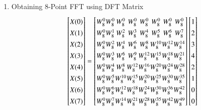 \documentclass[journal,12pt,twocolumn]{IEEEtran}
\renewcommand\thesection{\arabic{section}}
\begin{document}
\begin{enumerate}[label=\thesection.\arabic*.,ref=\thesection.\theenumi]
\item Obtaining 8-Point FFT using DFT Matrix
\begin{equation}
\renewcommand{\arraystretch}{1.35}
\setlength\arraycolsep{0.05pt}
\begin{bmatrix}
X(0) \\
X(1) \\
X(2) \\
X(3) \\
X(4) \\
X(5) \\
X(6) \\
X(7)
\end{bmatrix}
=
\begin{bmatrix}
W^{0}_{8} & W^{0}_{8} & W^{0}_{8} & W^{0}_{8} & W^{0}_{8} & W^{0}_{8} & W^{0}_{8} & W^{0}_{8}\\
W^{0}_{8} & W^{1}_{8} & W^{2}_{8} & W^{3}_{8} & W^{4}_{8} & W^{5}_{8} & W^{6}_{8} & W^{7}_{8}\\
W^{0}_{8} & W^{2}_{8} & W^{4}_{8} & W^{6}_{8} & W^{8}_{8} & W^{10}_{8} & W^{12}_{8} & W^{14}_{8}\\
W^{0}_{8} & W^{3}_{8} & W^{6}_{8} & W^{9}_{8} & W^{12}_{8} & W^{15}_{8} & W^{18}_{8} & W^{21}_{8}\\
W^{0}_{8} & W^{4}_{8} & W^{8}_{8} & W^{12}_{8} & W^{16}_{8} & W^{20}_{8} & W^{24}_{8} & W^{28}_{8}\\
W^{0}_{8} & W^{5}_{8} & W^{10}_{8} & W^{15}_{8} & W^{20}_{8} & W^{25}_{8} & W^{30}_{8} & W^{35}_{8}\\
W^{0}_{8} & W^{6}_{8} & W^{12}_{8} & W^{18}_{8} & W^{24}_{8} & W^{30}_{8} & W^{36}_{8} & W^{42}_{8}\\
W^{0}_{8} & W^{7}_{8} & W^{14}_{8} & W^{21}_{8} & W^{28}_{8} & W^{35}_{8} & W^{42}_{8} & W^{49}_{8}
\end{bmatrix}
\begin{bmatrix}
1 \\
2 \\
3 \\
4 \\
2 \\
1 \\
0 \\
0
\end{bmatrix}
\end{equation}

\end{enumerate}
\end{document}
